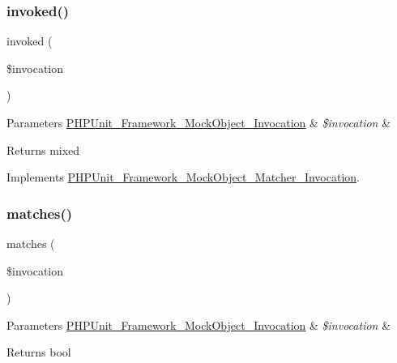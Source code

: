 \subsubsection{\texorpdfstring{invoked()}{invoked()}}
{\footnotesize\ttfamily invoked (\begin{DoxyParamCaption}\item[{\mbox{\hyperlink{interface_p_h_p_unit___framework___mock_object___invocation}{P\+H\+P\+Unit\+\_\+\+Framework\+\_\+\+Mock\+Object\+\_\+\+Invocation}}}]{\$invocation }\end{DoxyParamCaption})}


\begin{DoxyParams}[1]{Parameters}
\mbox{\hyperlink{interface_p_h_p_unit___framework___mock_object___invocation}{P\+H\+P\+Unit\+\_\+\+Framework\+\_\+\+Mock\+Object\+\_\+\+Invocation}} & {\em \$invocation} & \\
\hline
\end{DoxyParams}
\begin{DoxyReturn}{Returns}
mixed 
\end{DoxyReturn}


Implements \mbox{\hyperlink{interface_p_h_p_unit___framework___mock_object___matcher___invocation_a63f37b06181c9547bc3c225007c34425}{P\+H\+P\+Unit\+\_\+\+Framework\+\_\+\+Mock\+Object\+\_\+\+Matcher\+\_\+\+Invocation}}.

\mbox{\label{class_p_h_p_unit___framework___mock_object___matcher_a4988c6fa11e275302172d0a4ae32dd3a}} 
\subsubsection{\texorpdfstring{matches()}{matches()}}
{\footnotesize\ttfamily matches (\begin{DoxyParamCaption}\item[{\mbox{\hyperlink{interface_p_h_p_unit___framework___mock_object___invocation}{P\+H\+P\+Unit\+\_\+\+Framework\+\_\+\+Mock\+Object\+\_\+\+Invocation}}}]{\$invocation }\end{DoxyParamCaption})}


\begin{DoxyParams}[1]{Parameters}
\mbox{\hyperlink{interface_p_h_p_unit___framework___mock_object___invocation}{P\+H\+P\+Unit\+\_\+\+Framework\+\_\+\+Mock\+Object\+\_\+\+Invocation}} & {\em \$invocation} & \\
\hline
\end{DoxyParams}
\begin{DoxyReturn}{Returns}
bool 
\end{DoxyReturn}


